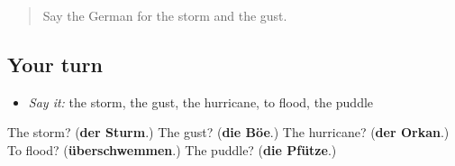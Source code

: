 \begin{quote}
Say the German for the storm and the gust.
\end{quote}

\subsection*{Your turn}
\begin{itemize}
\raggedright
  \item \emph{Say it:} the storm, the gust, the hurricane, to flood, the puddle
\end{itemize}

\begin{tcolorbox}[breakable,colback=teal!4,colframe=teal!35!black,title={Before you move on}]
The storm? (\textbf{der Sturm}.) The gust? (\textbf{die Böe}.) The hurricane? (\textbf{der Orkan}.) To flood? (\textbf{überschwemmen}.) The puddle? (\textbf{die Pfütze}.)
\end{tcolorbox}
